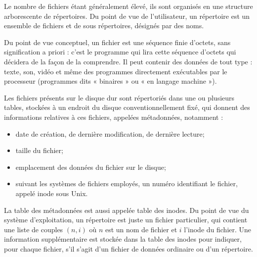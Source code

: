 \documentclass[10pt,fleqn]{article} %
\begin{document}
Le nombre de fichiers étant généralement élevé, ils sont organisés en une structure arborescente
de répertoires. Du point de vue de l'utilisateur, un répertoire est un ensemble de fichiers et de sous répertoires, désignés par des noms.
%
%
%

Du point de vue conceptuel, un fichier est une séquence finie d'octets, sans signification
a priori : c'est le programme qui lira cette séquence d'octets qui décidera de la façon de
la comprendre. Il peut contenir des données de tout type : texte, son, vidéo et même des
programmes directement exécutables par le processeur (programmes dits « binaires » ou
« en langage machine »).

Les fichiers présents sur le disque dur sont répertoriés dans une ou plusieurs tables, stockées
à un endroit du disque conventionnellement fixé, qui donnent des informations relatives
à ces fichiers, appelées métadonnées, notamment :
\begin{itemize}
\item date de création, de dernière modification, de dernière lecture;
\item taille du fichier;
\item emplacement des données du fichier sur le disque;
\item suivant les systèmes de fichiers employés, un numéro identifiant le fichier, appelé
inode sous Unix.
\end{itemize}

La table des métadonnées est aussi appelée table des inodes. Du point de vue du système d'exploitation, un répertoire est juste un fichier particulier,
qui contient une liste de couples $(n, i)$ où $n$ est un nom de fichier et $i$ l'inode du fichier.
Une information supplémentaire est stockée dans la table des inodes pour indiquer, pour
chaque fichier, s'il s'agit d'un fichier de données ordinaire ou d'un répertoire.
\end{document}
